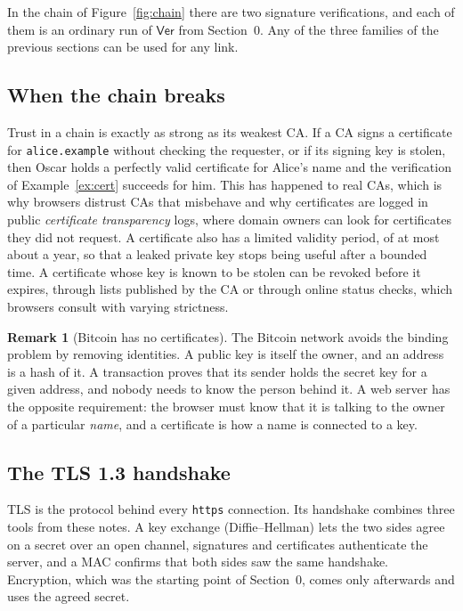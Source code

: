 \documentclass[11pt,a4paper]{article}
\theoremstyle{definition}
\newtheorem{remark}[definition]{Remark}
\newcommand{\Ver}{\mathsf{Ver}}
\begin{document}
In the chain of Figure~\ref{fig:chain} there are two signature verifications, and each of them is an ordinary run of $\Ver$ from Section~0. Any of the three families of the previous sections can be used for any link.

\subsection{When the chain breaks}

Trust in a chain is exactly as strong as its weakest CA. If a CA signs a certificate for \texttt{alice.example} without checking the requester, or if its signing key is stolen, then Oscar holds a perfectly valid certificate for Alice's name and the verification of Example~\ref{ex:cert} succeeds for him. This has happened to real CAs, which is why browsers distrust CAs that misbehave and why certificates are logged in public \emph{certificate transparency} logs, where domain owners can look for certificates they did not request. A certificate also has a limited validity period, of at most about a year, so that a leaked private key stops being useful after a bounded time. A certificate whose key is known to be stolen can be revoked before it expires, through lists published by the CA or through online status checks, which browsers consult with varying strictness.

\begin{remark}[Bitcoin has no certificates]
The Bitcoin network avoids the binding problem by removing identities. A public key is itself the owner, and an address is a hash of it. A transaction proves that its sender holds the secret key for a given address, and nobody needs to know the person behind it. A web server has the opposite requirement: the browser must know that it is talking to the owner of a particular \emph{name}, and a certificate is how a name is connected to a key.
\end{remark}

\subsection{The TLS 1.3 handshake}\label{sec:tls}

TLS is the protocol behind every \texttt{https} connection. Its handshake combines three tools from these notes. A key exchange (Diffie--Hellman) lets the two sides agree on a secret over an open channel, signatures and certificates authenticate the server, and a MAC confirms that both sides saw the same handshake. Encryption, which was the starting point of Section~0, comes only afterwards and uses the agreed secret.
\end{document}
